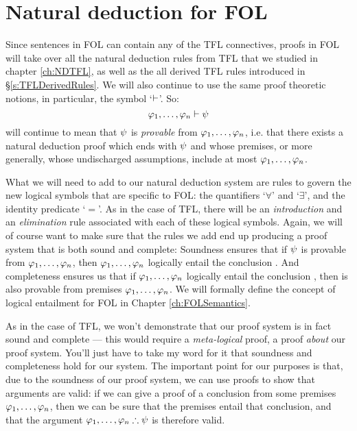 \chapter{Natural deduction for FOL}\label{ch:NDFOL}


Since sentences in FOL can contain any of the TFL connectives, proofs in FOL will take over all the natural deduction rules from TFL that we studied in chapter \ref{ch:NDTFL}, as well as the all derived  TFL rules introduced in \S \ref{s:TFLDerivedRules}.  We will also continue to use the same proof theoretic notions, in particular, the symbol `$\vdash$'.  So:
$$\mathcal{\varphi}_1, \ldots, \mathcal{\varphi}_n \vdash \mathcal{\psi}$$
will continue to mean that $\mathcal{\psi}$ is \emph{provable} from $\mathcal{\varphi}_1, \ldots, \mathcal{\varphi}_n$, i.e. that there exists a natural deduction proof which ends with $\mathcal{\psi}$ and whose premises, or more generally, whose undischarged assumptions, include at most $\mathcal{\varphi}_1, \ldots, \mathcal{\varphi}_n$.


What we will need to add to our natural deduction system are rules to govern the new logical symbols that are specific to FOL: the quantifiers `$\forall$' and `$\exists$', and the identity predicate `$=$'.  As in the case of TFL, there will be an \emph{introduction} and an \emph{elimination} rule associated with each of these logical symbols.  Again, we will of course want to make sure that the rules we add end up producing a proof system that is both sound and complete:
Soundness ensures that if $\mathcal{\psi}$ is provable from $\mathcal{\varphi}_1, \ldots, \mathcal{\varphi}_n$, then $\mathcal{\varphi}_1, \ldots, \mathcal{\varphi}_n$ logically entail the conclusion \meta{\psi}.  And completeness ensures us that if $\mathcal{\varphi}_1, \ldots, \mathcal{\varphi}_n$ logically entail the conclusion \meta{\psi}, then \meta{\psi} is also provable from premises $\mathcal{\varphi}_1, \ldots, \mathcal{\varphi}_n$.  We will formally define the concept of logical entailment  for FOL in Chapter \ref{ch:FOLSemantics}.

As in the case of TFL, we won't demonstrate that our proof system is in fact sound and complete --- this would require a \emph{meta-logical} proof, a proof \emph{about} our proof system.  You'll just have to take my word for it that soundness and completeness hold for our system. The important point for our purposes is that, due to the soundness of our proof system, we can use proofs to show that arguments are valid: if we can give a proof of a conclusion \meta{\psi} from some premises $\mathcal{\varphi}_1, \ldots, \mathcal{\varphi}_n$, then we can be sure that the premises entail that conclusion, and that the argument $\mathcal{\varphi}_1, \ldots, \mathcal{\varphi}_n \therefore \mathcal{\psi}$ is therefore valid.


